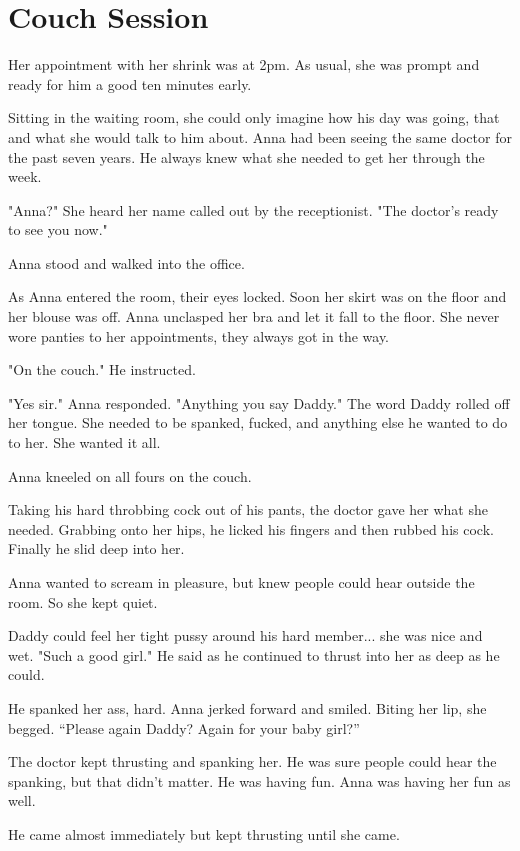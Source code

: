 \section{Couch Session}

Her appointment with her shrink was at 
2pm. As usual, she was prompt and ready 
for him a good ten minutes early. 

     Sitting in the waiting room, she could 
only imagine how his day was going, that 
and what she would talk to him about. Anna 
had been seeing the same doctor for the past 
seven years. He always knew what she 
needed to get her through the week. 

     "Anna?" She heard her name called out 
by the receptionist. "The doctor's ready to 
see you  now." 

     Anna stood and walked into the office. 

     As Anna entered the room, their eyes 
locked. Soon her skirt was on the floor and 
her blouse was off. Anna unclasped her bra 
and let it fall to the floor. She never wore 
panties to her appointments, they always 
got in the way. 

     "On the couch." He instructed. 

     "Yes sir." Anna responded. "Anything you 
say Daddy." The word Daddy rolled off her 
tongue. She needed to be spanked, fucked, 
and anything else he wanted to do to her. 
She wanted it all. 

     Anna kneeled on all fours on the couch. 

     Taking his hard throbbing cock out of his 
pants, the doctor gave her what she needed. 
Grabbing onto her hips, he licked his fingers 
and then rubbed his cock. Finally he slid 
deep into her. 

     Anna wanted to scream in pleasure, but 
knew people could hear outside the room. 
So she kept quiet. 

     Daddy could feel her tight pussy around 
his hard member... she was nice and wet. 
"Such a good girl." He said as he continued 
to thrust into her as deep as he could. 

     He spanked her ass, hard. Anna jerked 
forward and smiled. Biting her lip, she 
begged. “Please again Daddy? Again for 
your baby girl?” 

     The doctor kept thrusting and spanking 
her. He was sure people could hear the 
spanking, but that didn’t matter. He was 
having fun. Anna was having her fun as well. 

     He came almost immediately but kept 
thrusting until she came. 

